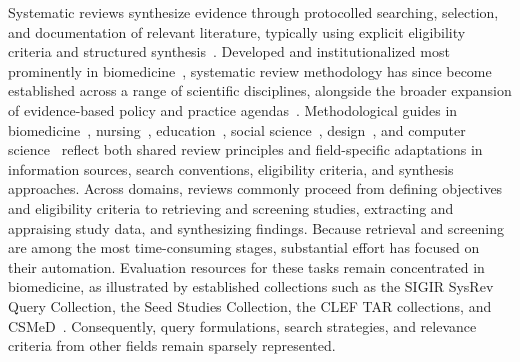 Systematic reviews synthesize evidence through protocolled searching, selection, and documentation of relevant literature, typically using explicit eligibility criteria and structured synthesis~\cite{gough:2012,liberati:2009,mulrow:1994}. Developed and institutionalized most prominently in biomedicine~\cite{chalmers:1993,guyatt:1992}, systematic review methodology has since become established across a range of scientific disciplines, alongside the broader expansion of evidence-based policy and practice agendas~\cite{simons:2021}. Methodological guides in biomedicine~\cite{chandler_cochrane_2019}, nursing~\cite{bettany_saltikov_how_2012}, education~\cite{newman_systematic_2020}, social science~\cite{petticrew_systematic_2008}, design~\cite{lame:2019}, and computer science~\cite{kitchenham:2004} reflect both shared review principles and field-specific adaptations in information sources, search conventions, eligibility criteria, and synthesis approaches. Across domains, reviews commonly proceed from defining objectives and eligibility criteria to retrieving and screening studies, extracting and appraising study data, and synthesizing findings. Because retrieval and screening are among the most time-consuming stages, substantial effort has focused on their automation. Evaluation resources for these tasks remain concentrated in biomedicine, as illustrated by established collections such as the SIGIR SysRev Query Collection, the Seed Studies Collection, the CLEF TAR collections, and CSMeD~\cite{scells:2017,wang:2022,kanoulas:2017,kusa:2023}. Consequently, query formulations, search strategies, and relevance criteria from other fields remain sparsely represented.


